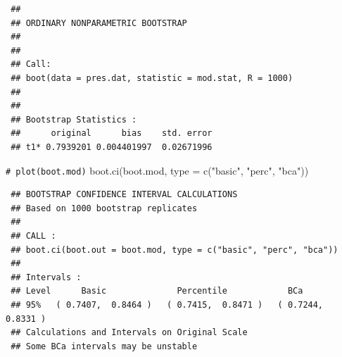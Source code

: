 \documentclass[
]{book}
\newenvironment{Shaded}{\begin{snugshade}}{\end{snugshade}}
\newcommand{\AttributeTok}[1]{\textcolor[rgb]{0.77,0.63,0.00}{#1}}
\newcommand{\CommentTok}[1]{\textcolor[rgb]{0.56,0.35,0.01}{\textit{#1}}}
\newcommand{\ControlFlowTok}[1]{\textcolor[rgb]{0.13,0.29,0.53}{\textbf{#1}}}
\newcommand{\DecValTok}[1]{\textcolor[rgb]{0.00,0.00,0.81}{#1}}
\newcommand{\FunctionTok}[1]{\textcolor[rgb]{0.00,0.00,0.00}{#1}}
\newcommand{\NormalTok}[1]{#1}
\newcommand{\OtherTok}[1]{\textcolor[rgb]{0.56,0.35,0.01}{#1}}
\newcommand{\SpecialCharTok}[1]{\textcolor[rgb]{0.00,0.00,0.00}{#1}}
\newcommand{\StringTok}[1]{\textcolor[rgb]{0.31,0.60,0.02}{#1}}
\theoremstyle{break}
\theoremstyle{nonumberplain}
\renewcommand{\CommentTok}[1]{\textcolor[rgb]{0.41,0.41,0.41}{\texttt{#1}}}
\begin{document}
\begin{Shaded}
\end{Shaded}

\begin{verbatim}
 ## 
 ## ORDINARY NONPARAMETRIC BOOTSTRAP
 ## 
 ## 
 ## Call:
 ## boot(data = pres.dat, statistic = mod.stat, R = 1000)
 ## 
 ## 
 ## Bootstrap Statistics :
 ##      original      bias    std. error
 ## t1* 0.7939201 0.004401997  0.02671996
\end{verbatim}

\begin{Shaded}
\begin{Highlighting}[]
\CommentTok{\# plot(boot.mod)}
\FunctionTok{boot.ci}\NormalTok{(boot.mod, }\AttributeTok{type =} \FunctionTok{c}\NormalTok{(}\StringTok{"basic"}\NormalTok{, }\StringTok{"perc"}\NormalTok{, }\StringTok{"bca"}\NormalTok{))}
\end{Highlighting}
\end{Shaded}

\begin{verbatim}
 ## BOOTSTRAP CONFIDENCE INTERVAL CALCULATIONS
 ## Based on 1000 bootstrap replicates
 ## 
 ## CALL : 
 ## boot.ci(boot.out = boot.mod, type = c("basic", "perc", "bca"))
 ## 
 ## Intervals : 
 ## Level      Basic              Percentile            BCa          
 ## 95%   ( 0.7407,  0.8464 )   ( 0.7415,  0.8471 )   ( 0.7244,  0.8331 )  
 ## Calculations and Intervals on Original Scale
 ## Some BCa intervals may be unstable
\end{verbatim}
\end{document}
